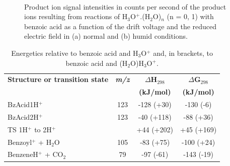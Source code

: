 \begin{figure}[htbp]
\centering
{}\\
\caption{Product ion signal intensities in counts per second of the product ions resulting from reactions of H$_3$O$^+$.(H$_2$O)$_n$ (n = 0, 1) with benzoic acid as a function of the drift voltage and the reduced electric field in (a) normal and (b) humid conditions.} 
\label{fig:bzacidEN}
\end{figure}

\begin{table}[htbp]
\centering
\caption{Energetics relative to benzoic acid and H$_3$O$^+$ and, in brackets, to benzoic acid and (H$_2$O)H$_3$O$^+$.}
\label{tb:bzacid2}
\begin{tabular}{lccc}
\toprule
\textbf{Structure or transition state}	&\textbf{\textit{m/z} } &\textbf{$\Delta$H$_{298}$} &\textbf{$\Delta$G$_{298}$}\\
& &	\textbf{(kJ/mol)} &\textbf{(kJ/mol)} \\  \toprule
BzAcid1H$^+$ & 123 & -128 (+30) & -130 (-6) \\ \midrule
BzAcid2H$^+$ & 123 & -40 (+118) & -88 (+36) \\ \midrule
TS 1H$^+$ to 2H$^+$ &  & +44 (+202) & +45 (+169) \\ \midrule
Benzoyl$^+$ + H$_2$O  & 105 & -83 (+75) & -100 (+24) \\ \midrule
BenzeneH$^+$ + CO$_2$ & 79 & -97 (-61) & -143 (-19) \\
\bottomrule
\end{tabular}
\end{table}


